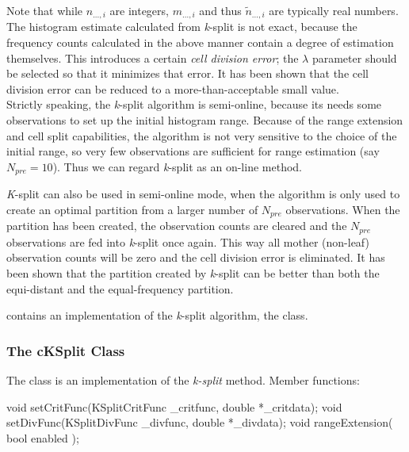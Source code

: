 
Note that while $n_{...,i}$ are integers, $m_{...,i}$ and thus
$\tilde{n}_{...,i}$ are typically real numbers. The histogram estimate
calculated from \textit{k}-split is not exact, because the frequency
counts calculated in the above manner contain a degree of estimation
themselves. This introduces a certain \textit{cell division error};
the $\lambda$ parameter should be selected so that it minimizes that
error. It has been shown that the cell division error can
be reduced to a more-than-acceptable small value.\\
Strictly speaking, the \textit{k}-split algorithm is semi-online,
because its needs some observations to set up the initial histogram
range.  Because of the range extension and cell split
capabilities, the algorithm is not very sensitive to the choice of the
initial range, so very few observations are sufficient for range
estimation (say $N_{pre}=10$). Thus we can regard \textit{k}-split as
an on-line method.

\textit{K}-split can also be used in semi-online mode, when the
algorithm is only used to create an optimal partition from a larger
number of $N_{pre}$ observations. When the partition has been created,
the observation counts are cleared and the $N_{pre}$ observations are
fed into \textit{k}-split once again. This way all mother (non-leaf)
observation counts will be zero and the cell division error is
eliminated. It has been shown that the partition created by
\textit{k}-split can be better than both the equi-distant and the
equal-frequency partition.


{\opp} contains an implementation of the \textit{k}-split algorithm,
the  class.

\subsubsection{The cKSplit Class}

The  class is an implementation of the \textit{k-split} method.
Member functions:

%
%

\begin{cpp}
void setCritFunc(KSplitCritFunc _critfunc, double *_critdata);
void setDivFunc(KSplitDivFunc \_divfunc, double *\_divdata);
void rangeExtension( bool enabled );
\end{cpp}


